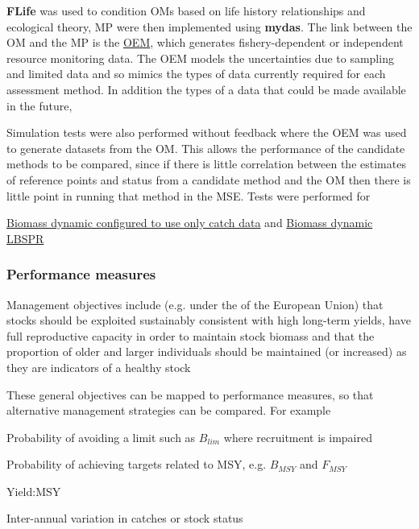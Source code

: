 \textbf{FLife} was used to  condition OMs based on life history relationships and ecological theory, MP were then implemented using \textbf{mydas}. The link between the OM and the MP is the \href{https://3o2y9wugzp1kfxr5hvzgzq-on.drv.tw/MyDas/vignettes/oem.html}{OEM}, which generates fishery-dependent or independent resource monitoring data. The OEM models the uncertainties due to sampling and limited data and so mimics the types of data currently required for each assessment method. In addition the types of a data that could be made available in the future,


Simulation tests were also performed without feedback where the OEM was used to generate datasets from the OM. This allows the performance of the candidate methods to be compared, since if there is little correlation between the estimates of reference points and status from a candidate method and the OM then there is little point in running that method in the MSE. Tests were performed for 

\href{https://3o2y9wugzp1kfxr5hvzgzq-on.drv.tw/MyDas/tasks/4/R/simtest-bdsra.pdf}{Biomass dynamic configured to use only catch data} and 
\href{https://3o2y9wugzp1kfxr5hvzgzq-on.drv.tw/MyDas/tasks/4/R/simtest-bd.pdf}{Biomass dynamic}
\href{https://3o2y9wugzp1kfxr5hvzgzq-on.drv.tw/MyDas/tasks/4/R/simtest-lbspr.pdf}{LBSPR}

\subsubsection*{Performance measures} 

Management objectives include (e.g. under the %
of the European Union) that stocks should be exploited sustainably consistent with high long-term yields, have full reproductive capacity in order to maintain stock biomass and that the proportion of older and larger individuals should be maintained (or increased) as they are indicators of a healthy stock

These general objectives can be mapped to performance measures, so that alternative management strategies can be compared. For example

\begin{description}[labelindent=\parindent,noitemsep,topsep=0pt,parsep=0pt,partopsep=0pt]
 \item[Safety] Probability of avoiding a limit such as  $B_{lim}$ where recruitment is impaired
 \item[Status] Probability of achieving targets related to MSY, e.g.  $B_{MSY}$ and $F_{MSY}$
 \item[Yield] Yield:MSY
 \item[Variability] Inter-annual variation in catches or stock status
\end{description}


